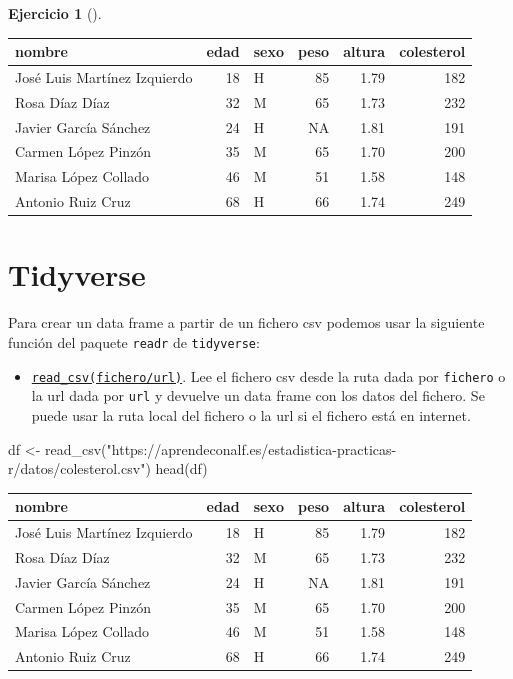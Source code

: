 \documentclass[
  a4paper,
]{scrreport}
\newenvironment{Shaded}{\begin{snugshade}}{\end{snugshade}}
\newcommand{\FunctionTok}[1]{\textcolor[rgb]{0.28,0.35,0.67}{#1}}
\newcommand{\NormalTok}[1]{\textcolor[rgb]{0.00,0.23,0.31}{#1}}
\newcommand{\OtherTok}[1]{\textcolor[rgb]{0.00,0.23,0.31}{#1}}
\newcommand{\StringTok}[1]{\textcolor[rgb]{0.13,0.47,0.30}{#1}}
\providecommand{\tightlist}{%
  \setlength{\itemsep}{0pt}\setlength{\parskip}{0pt}}\usepackage{longtable,booktabs,array}
\theoremstyle{definition}
\newtheorem{exercise}{Ejercicio}[chapter]
\theoremstyle{remark}
\begin{document}
\begin{exercise}[]
\begin{enumerate}
\begin{tcolorbox}
  \begin{longtable}[]{@{}lrlrrr@{}}
  \toprule\noalign{}
  nombre & edad & sexo & peso & altura & colesterol \\
  \midrule\noalign{}
  \endhead
  \bottomrule\noalign{}
  \endlastfoot
  José Luis Martínez Izquierdo & 18 & H & 85 & 1.79 & 182 \\
  Rosa Díaz Díaz & 32 & M & 65 & 1.73 & 232 \\
  Javier García Sánchez & 24 & H & NA & 1.81 & 191 \\
  Carmen López Pinzón & 35 & M & 65 & 1.70 & 200 \\
  Marisa López Collado & 46 & M & 51 & 1.58 & 148 \\
  Antonio Ruiz Cruz & 68 & H & 66 & 1.74 & 249 \\
  \end{longtable}

  \section{Tidyverse}

  Para crear un data frame a partir de un fichero csv podemos usar la
  siguiente función del paquete \texttt{readr} de \texttt{tidyverse}:

  \begin{itemize}
  \tightlist
  \item
    \href{https://readr.tidyverse.org/reference/read_delim.html}{\texttt{read\_csv(fichero/url)}}.
    Lee el fichero csv desde la ruta dada por \texttt{fichero} o la url
    dada por \texttt{url} y devuelve un data frame con los datos del
    fichero. Se puede usar la ruta local del fichero o la url si el
    fichero está en internet.
  \end{itemize}

\begin{Shaded}
\begin{Highlighting}[]
\NormalTok{df }\OtherTok{\textless{}{-}} \FunctionTok{read\_csv}\NormalTok{(}\StringTok{"https://aprendeconalf.es/estadistica{-}practicas{-}r/datos/colesterol.csv"}\NormalTok{)}
\FunctionTok{head}\NormalTok{(df)}
\end{Highlighting}
\end{Shaded}

  \begin{longtable}[]{@{}lrlrrr@{}}
  \toprule\noalign{}
  nombre & edad & sexo & peso & altura & colesterol \\
  \midrule\noalign{}
  \endhead
  \bottomrule\noalign{}
  \endlastfoot
  José Luis Martínez Izquierdo & 18 & H & 85 & 1.79 & 182 \\
  Rosa Díaz Díaz & 32 & M & 65 & 1.73 & 232 \\
  Javier García Sánchez & 24 & H & NA & 1.81 & 191 \\
  Carmen López Pinzón & 35 & M & 65 & 1.70 & 200 \\
  Marisa López Collado & 46 & M & 51 & 1.58 & 148 \\
  Antonio Ruiz Cruz & 68 & H & 66 & 1.74 & 249 \\
  \end{longtable}


\end{tcolorbox}
\end{enumerate}
\end{exercise}
\end{document}
